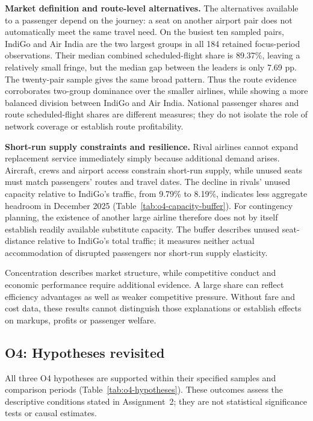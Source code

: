 \documentclass[12pt,a4paper]{article}
\begin{document}
\textbf{Market definition and route-level alternatives.} The alternatives available to a passenger depend on the journey: a seat on another airport pair does not automatically meet the same travel need. On the busiest ten sampled pairs, IndiGo and Air India are the two largest groups in all 184 retained focus-period observations. Their median combined scheduled-flight share is 89.37\%, leaving a relatively small fringe, but the median gap between the leaders is only 7.69 pp. The twenty-pair sample gives the same broad pattern. Thus the route evidence corroborates two-group dominance over the smaller airlines, while showing a more balanced division between IndiGo and Air India. National passenger shares and route scheduled-flight shares are different measures; they do not isolate the role of network coverage or establish route profitability.

\textbf{Short-run supply constraints and resilience.} Rival airlines cannot expand replacement service immediately simply because additional demand arises. Aircraft, crews and airport access constrain short-run supply, while unused seats must match passengers' routes and travel dates. The decline in rivals' unused capacity relative to IndiGo's traffic, from 9.79\% to 8.19\%, indicates less aggregate headroom in December 2025 (Table~\ref{tab:o4-capacity-buffer}). For contingency planning, the existence of another large airline therefore does not by itself establish readily available substitute capacity. The buffer describes unused seat-distance relative to IndiGo's total traffic; it measures neither actual accommodation of disrupted passengers nor short-run supply elasticity.

Concentration describes market structure, while competitive conduct and economic performance require additional evidence. A large share can reflect efficiency advantages as well as weaker competitive pressure. Without fare and cost data, these results cannot distinguish those explanations or establish effects on markups, profits or passenger welfare.

\clearpage
\subsection{O4: Hypotheses revisited}
All three O4 hypotheses are supported within their specified samples and comparison periods (Table~\ref{tab:o4-hypotheses}). These outcomes assess the descriptive conditions stated in Assignment~2; they are not statistical significance tests or causal estimates.
\end{document}
